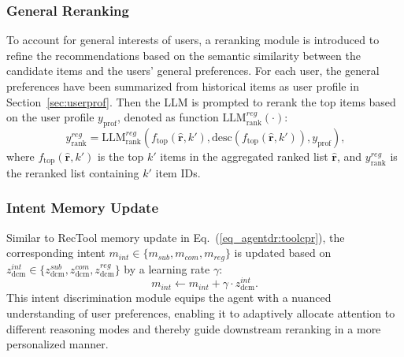 \subsubsection{General Reranking}\label{sec:genrerank}
To account for general interests of users, a reranking module is introduced to refine the recommendations based on the semantic similarity between the candidate items and the users' general preferences. For each user, the general preferences have been summarized from historical items as user profile in Section~\ref{sec:userprof}. Then the LLM is prompted to rerank the top items based on the user profile $y_{\text{prof}}$, denoted as function $\text{LLM}^{reg}_{\text{rank}}(\cdot)$:
\begin{equation}~\label{eq_agentdr:gen_rerank}
    y_{\text{rank}}^{reg} = \text{LLM}^{reg}_{\text{rank}}(f_\text{top}(\hat{\mathbf{r}},k'), \text{desc}(f_\text{top}(\hat{\mathbf{r}},k')),y_{\text{prof}}),
\end{equation}
where $f_\text{top}(\hat{\mathbf{r}},k')$ is the top $k'$ items in the aggregated ranked list $\hat{\mathbf{r}}$, and $y_{\text{rank}}^{reg}$ is the reranked list containing $k'$ item IDs.

\subsubsection{Intent Memory Update}
Similar to RecTool memory update in Eq.~(\ref{eq_agentdr:toolcpr}), the corresponding intent $m_{int}\in \{m_{sub}, m_{com}, m_{reg}\}$ is updated based on $z_{\text{dcm}}^{int}\in \{z_{\text{dcm}}^{sub}, z_{\text{dcm}}^{com}, z_{\text{dcm}}^{reg}\}$ by a learning rate $\gamma$:
\begin{equation}\label{eq_agentdr:intentdcm}
    m_{int} \leftarrow  m_{int} + \gamma\cdot z_{\text{dcm}}^{int}.
\end{equation}
This intent discrimination module equips the agent with a nuanced understanding of user preferences, enabling it to adaptively allocate attention to different reasoning modes and thereby guide downstream reranking in a more personalized manner.

